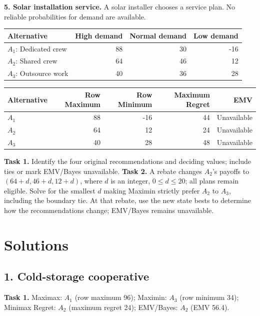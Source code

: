 \begin{studentproblem}
\textbf{5. Solar installation service.} A solar installer chooses a service plan. No reliable probabilities for demand are available.
\begin{center}\begin{tabular}{lrrr}\toprule Alternative & High demand & Normal demand & Low demand\\
\midrule
$A_1$: Dedicated crew & 88 & 30 & -16\\
$A_2$: Shared crew & 64 & 46 & 12\\
$A_3$: Outsource work & 40 & 36 & 28\\
\bottomrule\end{tabular}\end{center}
\begin{center}\begin{tabular}{lrrrr}\toprule Alternative & Row Maximum & Row Minimum & Maximum Regret & EMV\\\midrule
$A_1$ & 88 & -16 & 44 & Unavailable\\
$A_2$ & 64 & 12 & 24 & Unavailable\\
$A_3$ & 40 & 28 & 48 & Unavailable\\
\bottomrule\end{tabular}\end{center}
\textbf{Task 1.} Identify the four original recommendations and deciding values; include ties or mark EMV/Bayes unavailable.
\choices
\textbf{Task 2.} A rebate changes $A_2$'s payoffs to $(64+d,46+d,12+d)$, where $d$ is an integer, $0\leq d\leq20$; all plans remain eligible. Solve for the smallest $d$ making Maximin strictly prefer $A_2$ to $A_3$, including the boundary tie. At that rebate, use the new state bests to determine how the recommendations change; EMV/Bayes remains unavailable.
\tasktwobox
\end{studentproblem}
\endgroup
\restoregeometry
\renewcommand{\baselinestretch}{1}\normalsize
\section*{Solutions}
\subsection*{1. Cold-storage cooperative}
\textbf{Task 1.} Maximax: $A_1$ (row maximum 96); Maximin: $A_3$ (row minimum 34); Minimax Regret: $A_2$ (maximum regret 24); EMV/Bayes: $A_2$ (EMV 56.4).

